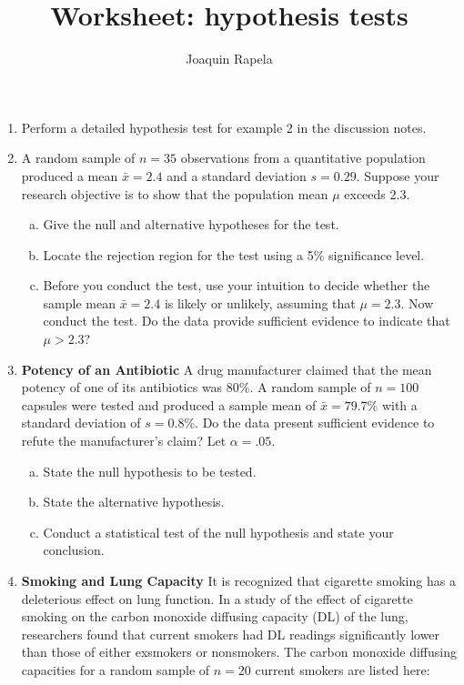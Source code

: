 \documentclass{article}
\title{Worksheet: hypothesis tests}
\author{Joaquin Rapela}
\begin{document}
\maketitle

\begin{enumerate}

    \item Perform a detailed hypothesis test for example 2 in the discussion
        notes.

	\item A random sample of $n=35$ observations from a quantitative population
produced a mean $\bar{x}=2.4$ and a standard deviation $s=0.29$. Suppose your
research objective is to show that the population mean $\mu$ exceeds 2.3.

		\begin{enumerate}[(a)]
			\item Give the null and alternative hypotheses for the test.
			\item Locate the rejection region for the test using a 5\% signiﬁcance level.
			\item Before you conduct the test, use your intuition to decide
whether the sample mean $\bar{x}=2.4$ is likely or unlikely, assuming that
$\mu=2.3$. Now conduct the test. Do the data provide sufficient evidence to
indicate that $\mu>2.3$? 
		\end{enumerate}

	\item \textbf{Potency of an Antibiotic} A drug manufacturer claimed that the mean
	potency of one of its antibiotics was 80\%. A random sample of $n=100$
	capsules were tested and produced a sample mean of $\bar{x}=79.7\%$ with a
	standard deviation of $s=0.8\%$. Do the data present sufficient evidence to
	refute the manufacturer’s claim? Let $\alpha=.05$.

		\begin{enumerate}[(a)]
			\item State the null hypothesis to be tested.
			\item State the alternative hypothesis.
			\item Conduct a statistical test of the null hypothesis and state your conclusion.
		\end{enumerate}

	\item \textbf{Smoking and Lung Capacity} It is recognized that cigarette smoking has a deleterious effect on lung function. In a study of the effect of cigarette smoking on the carbon monoxide diffusing capacity (DL) of the lung, researchers found that current smokers had DL readings signiﬁcantly lower than those of either exsmokers or nonsmokers. The carbon monoxide diffusing capacities for a random sample of $n=20$ current smokers are listed here:


\end{enumerate}
\end{document}
